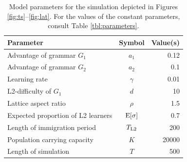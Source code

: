 \begin{table}\caption{Model parameters for the simulation depicted in Figures \ref{fig:ts}--\ref{fig:lat}. For the values of the constant parameters, consult Table \ref{tbl:parameters}.}\label{tbl:onerun}\begin{tabular}{lcr}
\toprule
Parameter & Symbol & Value(s) \\
\midrule
Advantage of grammar $G_1$ & $a_1$ & 0.12 \\
Advantage of grammar $G_2$ & $a_2$ & 0.1 \\
Learning rate & $\gamma$ & 0.01 \\
L2-difficulty of $G_1$ & $d$ & 10 \\
Lattice aspect ratio & $\rho$ & 1.5 \\
Expected proportion of L2 learners & $\textnormal{E}[\sigma]$ & 0.7 \\
Length of immigration period & $T_\textnormal{L2}$ & 200 \\
Population carrying capacity & $K$ & 20000 \\
Length of simulation & $T$ & 500 \\
\bottomrule
\end{tabular}
\end{table}
